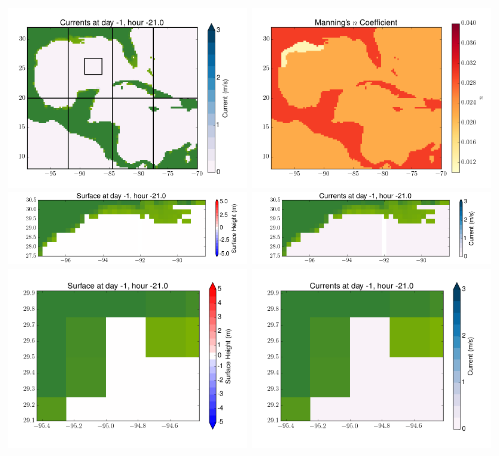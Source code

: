 \documentclass[11pt]{article}
\begin{document}
\includegraphics[width=0.475\textwidth]{frame0027fig2.png}
\vskip 10pt 
\includegraphics[width=0.475\textwidth]{frame0027fig3.png}
\includegraphics[width=0.475\textwidth]{frame0027fig4.png}
\vskip 10pt 
\includegraphics[width=0.475\textwidth]{frame0027fig5.png}
\includegraphics[width=0.475\textwidth]{frame0027fig6.png}
\vskip 10pt 
\includegraphics[width=0.475\textwidth]{frame0027fig7.png}
\end{document}
